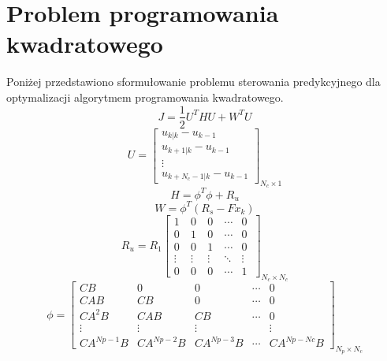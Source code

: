 \section{Problem programowania kwadratowego} \label{sec:qp}
Poniżej przedstawiono sformułowanie problemu sterowania predykcyjnego dla optymalizacji
algorytmem programowania kwadratowego. \cite{mpc_book} \cite{mpc_pl} \cite{mpc_en} \cite{nuclear} 
\begin{equation}
    J=\frac{1}{2}U^{T}HU+W^{T}U
    \label{eq:J}
\end{equation}
\begin{equation}
	U = \begin{bmatrix}
    u_{k|k}-u_{k-1} \\
	u_{k+1|k}-u_{k-1} \\
    \vdots \\
    u_{k+N_{c}-1|k}-u_{k-1}
	\end{bmatrix}_{N_{c} \times 1}
\label{eq:U}
\end{equation}
\begin{equation}
    H={\phi}^{T}\phi+R_{u}
    \label{eq:H}
\end{equation}
\begin{equation}
    W={\phi}^{T}(R_{s}-Fx_{k})
    \label{eq:W}
\end{equation}
\begin{equation}
    R_{u} = R_{1} 
    \begin{bmatrix}
	    1~& 0~& 0~& \cdots & 0~\\[-0.8ex]
	    0~& 1~& 0~& \cdots & 0~\\[-0.8ex]
	    0~& 0~& 1~& \cdots & 0~\\[-0.8ex]
        \vdots & \vdots & \vdots & \ddots & \vdots \\[-0.8ex]
        0~& 0~& 0~& \cdots & 1
	\end{bmatrix}_{N_{c} \times N_{c}}
\label{eq:Rw}
\end{equation}
\begin{equation}
	\phi = \begin{bmatrix}
	CB & 0~& 0~& \cdots & 0~\\
	CAB & CB~& 0~& \cdots & 0~\\
	CA^{2}B & CAB & CB~& \cdots & 0~\\
    \vdots & \vdots & \vdots &  & \vdots \\
    CA^{Np-1}B & CA^{Np-2}B & CA^{Np-3}B & \cdots & CA^{Np-Nc}B
	\end{bmatrix}
\label{eq:phi}_{N_{p} \times N_{c}}
\end{equation}
